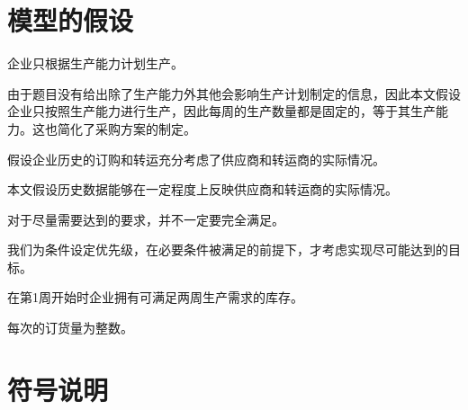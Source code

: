 \documentclass[withoutpreface,bwprint]{cumcmthesis} %
\begin{document}
\section{模型的假设}

\begin{assumption}
    企业只根据生产能力计划生产。
    \label{assumption001}
\end{assumption}

由于题目没有给出除了生产能力外其他会影响生产计划制定的信息，因此本文假设企业只按照生产能力进行生产，因此每周的生产数量都是固定的，等于其生产能力。这也简化了采购方案的制定。

\begin{assumption}
    假设企业历史的订购和转运充分考虑了供应商和转运商的实际情况。
    \label{供应能力假设}
\end{assumption}

本文假设历史数据能够在一定程度上反映供应商和转运商的实际情况。

\begin{assumption}
    对于尽量需要达到的要求，并不一定要完全满足。
    \label{assumption002}
\end{assumption}

我们为条件设定优先级，在必要条件被满足的前提下，才考虑实现尽可能达到的目标。

\begin{assumption}
    在第1周开始时企业拥有可满足两周生产需求的库存。
    \label{assumption003}
\end{assumption}

\begin{assumption}
    每次的订货量为整数。
    \label{供应能力假设}
\end{assumption}

\section{符号说明}
\end{document}
